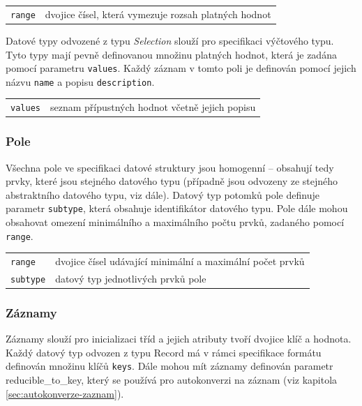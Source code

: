 \documentclass[FM,bw,DP]{tulthesis}
\begin{document}
\vspace{0.5cm}
\begin{tabular}{m{3cm}@{}l}
\texttt{range}\dotfill & dvojice čísel, která vymezuje rozsah platných hodnot \\
\end{tabular}
\vspace{0.5cm}

Datové typy odvozené z typu \textit{Selection} slouží pro specifikaci výčtového typu. Tyto typy mají pevně definovanou množinu platných hodnot, která je zadána pomocí parametru \texttt{values}. Každý záznam v tomto poli je definován pomocí jejich názvu \texttt{name} a popisu \texttt{description}.


\vspace{0.5cm}
\begin{tabular}{m{3cm}@{}l}
\texttt{values}\dotfill & seznam přípustných hodnot včetně jejich popisu \\
\end{tabular}

\subsubsection{Pole}

Všechna pole ve specifikaci datové struktury jsou homogenní -- obsahují tedy prvky, které jsou stejného datového typu (případně jsou odvozeny ze stejného abstraktního datového typu, viz dále). Datový typ potomků pole definuje parametr \texttt{subtype}, která obsahuje identifikátor datového typu. Pole dále mohou obsahovat omezení minimálního a maximálního počtu prvků, zadaného pomocí \texttt{range}.

\vspace{0.5cm}
\begin{tabular}{m{3cm}@{}l}
\texttt{range}\dotfill & dvojice čísel udávající minimální a maximální počet prvků \\
\texttt{subtype}\dotfill & datový typ jednotlivých prvků pole \\
\end{tabular}
\vspace{0.5cm}

\subsubsection{Záznamy}

Záznamy slouží pro inicializaci tříd a jejich atributy tvoří dvojice klíč a hodnota. Každý datový typ odvozen z typu Record má v rámci specifikace formátu definován množinu klíčů \texttt{keys}. Dále mohou mít záznamy definován parametr reducible\_to\_key, který se používá pro autokonverzi na záznam (viz kapitola \ref{sec:autokonverze-zaznam}).
\end{document}
